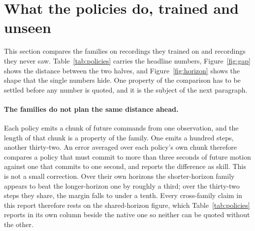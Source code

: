 \section{What the policies do, trained and unseen}
\label{sec:results}

This section compares the families on recordings they trained on and recordings
they never saw. Table~\ref{tab:policies} carries the headline numbers,
Figure~\ref{fig:gap} shows the distance between the two halves, and
Figure~\ref{fig:horizon} shows the shape that the single numbers hide. One
property of the comparison has to be settled before any number is quoted, and
it is the subject of the next paragraph.

\paragraph{The families do not plan the same distance ahead.}
Each policy emits a chunk of future commands from one observation, and the
length of that chunk is a property of the family. One emits a hundred steps,
another thirty-two. An error averaged over each policy's own chunk therefore
compares a policy that must commit to more than three seconds of future motion
against one that commits to one second, and reports the difference as skill.
This is not a small correction. Over their own horizons the shorter-horizon
family appears to beat the longer-horizon one by roughly a third; over the
thirty-two steps they share, the margin falls to under a tenth. Every
cross-family claim in this report therefore rests on the shared-horizon figure,
which Table~\ref{tab:policies} reports in its own column beside the native one
so neither can be quoted without the other.

\begin{table}[t]
  \centering
  \caption{Action error against the recorded commands, as a root-mean-square
  deviation. \emph{Horizon} is the number of future steps the family commits to
  from one observation. The left group scores each policy over its own horizon;
  the right group rescores every policy over the shortest horizon any of them
  uses, and is the only group safe to read across rows. \emph{Gap} is held-out
  error divided by trained-on error. It appears in both groups because it
  differs between them: the longer-horizon family's ratio falls from
  \num{5.3} to \num{4.1} when the far end of its chunk --- where its held-out
  error grows fastest --- is excluded.}
  \label{tab:policies}
  \small
  
\end{table}

